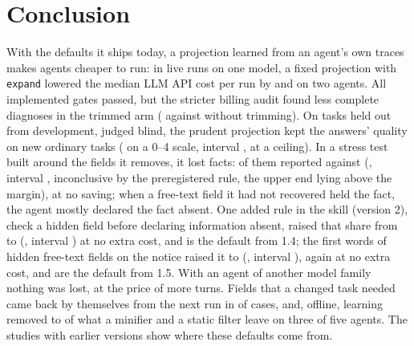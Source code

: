 \section{Conclusion}
\label{sec:conclusion}

With the defaults it ships today, a projection learned from an agent's own traces makes agents cheaper to run: in
live runs on one model, a fixed projection with \texttt{expand} lowered the median LLM API cost per run by
\SthreeEOneTrimCosti{} and \SthreeEOneTrimCostiv{} on two agents. All implemented gates passed, but the stricter
billing audit found less complete diagnoses in the trimmed arm (\AuditEOneAuditT{} against \AuditEOneAuditR{}
without trimming). On tasks held out from development, judged blind, the prudent projection kept the answers' quality
on new ordinary tasks (\SfourAPoint{} on a 0--4 scale, interval \SfourACI{}, at a ceiling). In a stress test built
around the fields it removes, it lost facts: \SfourBHiddenP{} of them reported against \SfourBHiddenR{} (\SfourBPoint{},
interval \SfourBCI{}, inconclusive by the preregistered rule, the upper end lying \SfourBMarginGap{} above the
margin), at no saving; when a free-text field it had not recovered held the fact, the agent mostly declared the fact
absent. One added rule in the skill (version 2), check a hidden
field before declaring information absent, raised that share from \SfourCHiddenPone{} to \SfourCHiddenPtwo{}
(\SfourCPoint{}, interval \SfourCCI{}) at no extra cost, and is the default from 1.4; the first words of hidden
free-text fields on the notice raised it to \SfourEHiddenPtwoT{} (\SfourEPoint{}, interval \SfourECI{}), again at no
extra cost, and are the default from 1.5. With an agent of another model family nothing was lost, at the price of
more turns. Fields that a changed task needed came back by themselves from the next run in \SthreeHFiveKept{} of
\SthreeHFiveRecoveries{} cases, and, offline, learning removed \BaseLearnedStaticBigMin{} to
\BaseLearnedStaticBigMax{} of what a minifier and a static filter leave on three of five agents. The studies with
earlier versions show where these defaults come from.

